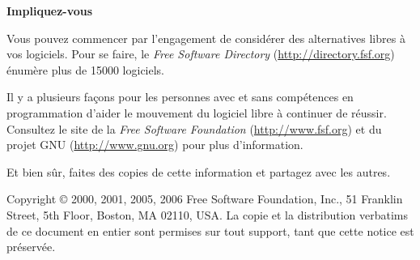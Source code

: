 \documentclass[12pt]{article}
\begin{document}

\begin{center}
{\Large\bf Impliquez-vous}
\end{center}

Vous pouvez commencer par l'engagement de considérer des alternatives libres à
vos logiciels. Pour se faire, le \textit{Free Software Directory}
(\url{http://directory.fsf.org}) énumère plus de 15000 logiciels.


Il y a plusieurs façons pour les personnes avec et sans compétences en
programmation d'aider le mouvement du logiciel libre à continuer de réussir.
Consultez le site de la \textit{Free Software Foundation}
(\url{http://www.fsf.org}) et du projet GNU (\url{http://www.gnu.org}) pour
plus d'information.

Et bien sûr, faites des copies de cette information et partagez avec les
autres.



\vspace{0.3in}

{\small

\noindent Copyright \copyright\/ 2000, 2001, 2005, 2006 Free Software Foundation, Inc., 51
Franklin Street, 5th Floor, Boston, MA 02110, USA.
La copie et la distribution verbatims de ce document en entier sont permises
sur tout support, tant que cette notice est préservée.

}
\end{document}
